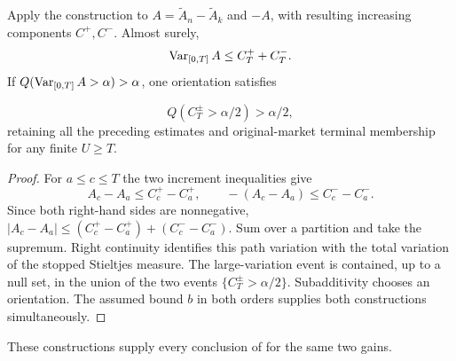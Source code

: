 \begin{proposition}
Apply the construction to $A=\widetilde A_n-\widetilde A_k$ and $-A$,
with resulting increasing components $C^+,C^-$. Almost surely,
\[
 \operatorname{Var}_{[0,T]}A\leq C^+_T+C^-_T.
\]
If $Q(\operatorname{Var}_{[0,T]}A>\alpha)>\alpha$, one orientation satisfies

\[
 Q(C^\pm_T>\alpha/2)>\alpha/2,
\] retaining all the preceding estimates and
original-market terminal membership for any finite $U\geq T$.
\end{proposition}
\begin{proof}
For $a\leq c\leq T$ the two increment inequalities give
\[
 A_c-A_a\leq C^+_c-C^+_a,\qquad
 -(A_c-A_a)\leq C^-_c-C^-_a.
\]
Since both right-hand sides are nonnegative,
$|A_c-A_a|\leq(C^+_c-C^+_a)+(C^-_c-C^-_a)$.
Sum over a partition and take the supremum. Right continuity identifies
this path variation with the total variation of the stopped Stieltjes measure.
The large-variation event is contained, up to a null set, in the union of
the two events $\{C^\pm_T>\alpha/2\}$. Subadditivity chooses an orientation.
The assumed bound $b$ in both orders supplies both constructions simultaneously.
\end{proof}

These constructions supply every conclusion of  for the same two gains.
